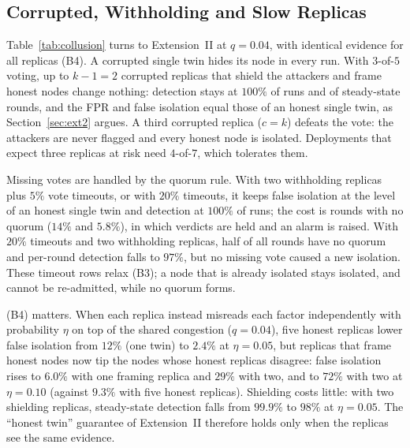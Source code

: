 \documentclass[lineno,pdflatex,sn-nature]{sn-jnl}
\theoremstyle{thmstyleone}%
\theoremstyle{thmstylethree}%
\begin{document}
\subsection{Corrupted, Withholding and Slow Replicas}
\label{sec:res-ext2}
Table~\ref{tab:collusion} turns to Extension~II at $q=0.04$, with
identical evidence for all replicas (B4).  A
corrupted single twin hides its node in every run.  With $3$-of-$5$
voting, up to $k-1=2$ corrupted replicas that shield the attackers and
frame honest nodes change nothing: detection stays at $100\%$ of runs
and of steady-state rounds, and the FPR and false isolation equal those
of an honest single twin, as Section~\ref{sec:ext2} argues.  A third
corrupted replica ($c=k$) defeats the vote: the attackers are never
flagged and every honest node is isolated.  Deployments that expect
three replicas at risk need $4$-of-$7$, which tolerates them.

Missing votes are handled by the quorum rule.  With two withholding
replicas plus $5\%$ vote timeouts, or with $20\%$ timeouts, it keeps
false isolation at the level of an honest single twin and detection at
$100\%$ of runs; the cost is rounds with no quorum ($14\%$ and
$5.8\%$), in which verdicts are held and an alarm is raised.  With
$20\%$ timeouts and two withholding replicas, half of all rounds have
no quorum and per-round detection falls to $97\%$, but no missing
vote caused a new isolation.  These timeout rows relax (B3); a node
that is already isolated stays isolated, and cannot be re-admitted,
while no quorum forms.

(B4) matters.  When each replica instead misreads each factor
independently with probability $\eta$ on top of the shared congestion
($q=0.04$), five honest replicas lower false isolation from $12\%$
(one twin) to $2.4\%$ at $\eta=0.05$, but replicas that frame honest
nodes now tip the nodes whose honest replicas disagree: false
isolation rises to $6.0\%$ with one framing replica and $29\%$ with
two, and to $72\%$ with two at $\eta=0.10$ (against $9.3\%$ with
five honest replicas).  Shielding costs little: with two shielding
replicas, steady-state detection falls from $99.9\%$ to $98\%$ at
$\eta=0.05$.  The ``honest twin'' guarantee of Extension~II therefore
holds only when the replicas see the same evidence.
\end{document}
